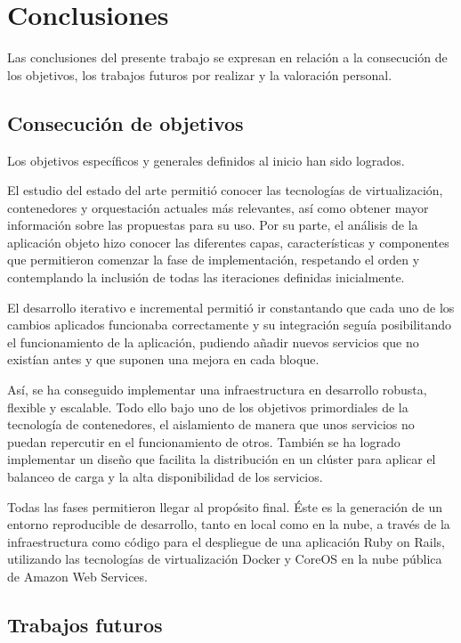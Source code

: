 \section{Conclusiones}

Las conclusiones del presente trabajo se expresan en relación a la consecución de los objetivos, los trabajos futuros por realizar y la valoración personal.

\subsection{Consecución de objetivos}

Los objetivos específicos y generales definidos al inicio han sido logrados.

El estudio del estado del arte permitió conocer las tecnologías de virtualización, contenedores y orquestación actuales más relevantes, así como obtener mayor información sobre las propuestas para su uso. Por su parte, el análisis de la aplicación objeto hizo conocer las diferentes capas, características y componentes que permitieron comenzar la fase de implementación, respetando el orden y contemplando la inclusión de todas las iteraciones definidas inicialmente. 

El desarrollo iterativo e incremental permitió ir constantando que cada uno de los cambios aplicados funcionaba correctamente y su integración seguía posibilitando el funcionamiento de la aplicación, pudiendo añadir nuevos servicios que no existían antes y que suponen una mejora en cada bloque.

Así, se ha conseguido implementar una infraestructura en desarrollo robusta, flexible y escalable. Todo ello bajo uno de los objetivos primordiales de la tecnología de contenedores, el aislamiento de manera que unos servicios no puedan repercutir en el funcionamiento de otros. También se ha logrado implementar un diseño que facilita la distribución en un clúster para aplicar el balanceo de carga y la alta disponibilidad de los servicios.

Todas las fases permitieron llegar al propósito final. Éste es la generación de un entorno reproducible de desarrollo, tanto en local como en la nube, a través de la infraestructura como código para el despliegue de una aplicación Ruby on Rails, utilizando las tecnologías de virtualización Docker y CoreOS en la nube pública de Amazon Web Services.

\subsection{Trabajos futuros} \label{trabajosfuturos}

